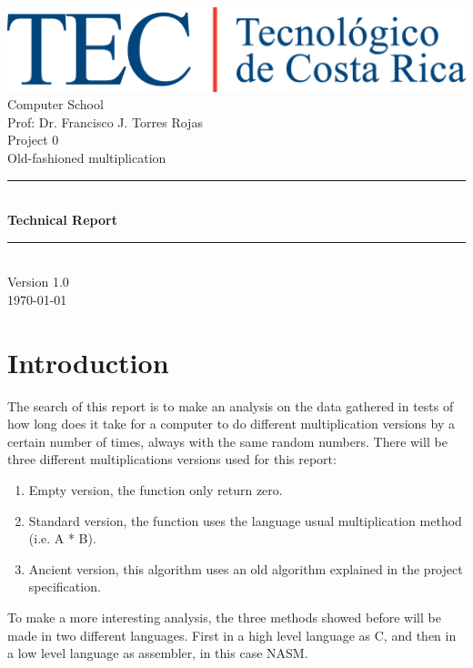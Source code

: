\documentclass[legalpaper,12pt]{article}
\begin{document}
\begin{titlepage}
    \begin{center}
        \includegraphics[width=1\textwidth]{logo}\\[3cm]
        {\large Computer School}\\[1cm]
        {\large Prof: Dr. Francisco J. Torres Rojas}\\[2cm]
        {\huge Project 0}\\[1cm]
        {\huge Old-fashioned multiplication }\\[1cm]
        \rule{\linewidth}{0.5mm} \\[0.4cm]
        { \huge \bfseries  Technical Report \\[0.4cm] }
        \rule{\linewidth}{0.5mm} \\[1.5cm]
        \vfill
        {\large Version 1.0 \\ \today}
    \end{center}
\end{titlepage}
\newpage

\renewcommand*\contentsname{Index}
\tableofcontents
\newpage

\section{Introduction}
\justifying
The search of this report is to make an analysis on the data gathered in tests of how long does it take for a computer to do different multiplication versions by a certain number of times, always with the same random numbers. There will be three different multiplications versions used for this report:
\begin{enumerate}
    \item Empty version, the function only return zero.
    \item Standard version, the function uses the language usual multiplication method (i.e. A * B).
    \item Ancient version, this algorithm uses an old algorithm explained in the project specification.
\end{enumerate}
\justifying
To make a more interesting analysis, the three methods showed before will be made in two different languages. First in a high level language as C, and then in a low level language as assembler, in this case NASM. 
\end{document}
